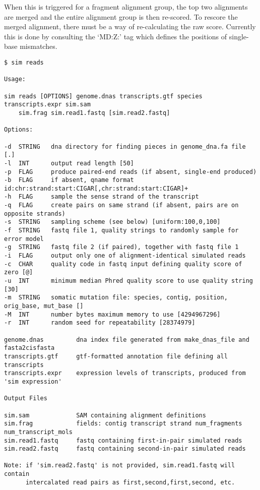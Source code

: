 \documentclass[10pt]{article}
\begin{document}
When this is triggered for a fragment alignment group, the top two
alignments are merged and the entire alignment group is then
re-scored. To rescore the merged alignment, there must be a way of
re-calculating the raw score. Currently this is done by consulting the
`MD:Z:' tag which defines the positions of single-base mismatches.



{\small
\begin{verbatim}
$ sim reads

Usage:

sim reads [OPTIONS] genome.dnas transcripts.gtf species transcripts.expr sim.sam
    sim.frag sim.read1.fastq [sim.read2.fastq]

Options:

-d  STRING   dna directory for finding pieces in genome_dna.fa file [.]
-l  INT      output read length [50]
-p  FLAG     produce paired-end reads (if absent, single-end produced)
-b  FLAG     if absent, qname format id:chr:strand:start:CIGAR[,chr:strand:start:CIGAR]+
-h  FLAG     sample the sense strand of the transcript
-q  FLAG     create pairs on same strand (if absent, pairs are on opposite strands)
-s  STRING   sampling scheme (see below) [uniform:100,0,100]
-f  STRING   fastq file 1, quality strings to randomly sample for error model
-g  STRING   fastq file 2 (if paired), together with fastq file 1
-i  FLAG     output only one of alignment-identical simulated reads
-c  CHAR     quality code in fastq input defining quality score of zero [@]
-u  INT      minimum median Phred quality score to use quality string [30]
-m  STRING   somatic mutation file: species, contig, position, orig_base, mut_base []
-M  INT      number bytes maximum memory to use [4294967296]
-r  INT      random seed for repeatability [28374979]

genome.dnas         dna index file generated from make_dnas_file and fasta2cisfasta
transcripts.gtf     gtf-formatted annotation file defining all transcripts
transcripts.expr    expression levels of transcripts, produced from 'sim expression'

Output Files

sim.sam             SAM containing alignment definitions
sim.frag            fields: contig transcript strand num_fragments num_transcript_mols
sim.read1.fastq     fastq containing first-in-pair simulated reads
sim.read2.fastq     fastq containing second-in-pair simulated reads

Note: if 'sim.read2.fastq' is not provided, sim.read1.fastq will contain
      intercalated read pairs as first,second,first,second, etc.


\end{verbatim}}
\end{document}
